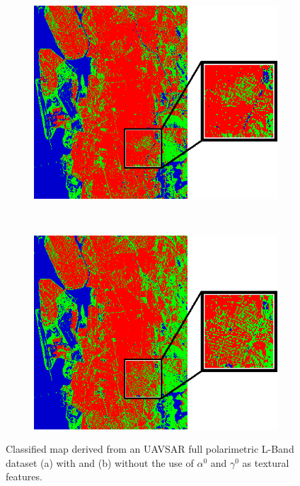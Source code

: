 



\begin{figure}[tbp]
	\centering
	\begin{subfigure}[t]{0.4\columnwidth}
		\centering
		\includegraphics[width = \columnwidth]{Figures/REVIEW/TextureBZ}
		\caption{}
	\end{subfigure}%
	~ 
	\begin{subfigure}[t]{0.4\columnwidth}
		\centering
		\includegraphics[width = \columnwidth]{Figures/REVIEW/NoTextureBZ}
		\caption{}
	\end{subfigure}   
	\caption{Classified map derived from an UAVSAR full polarimetric L-Band dataset (a) with and (b) without the use of $\alpha^0$ and $\gamma^0$ as textural features. }
	\label{fig:texture}
\end{figure}

